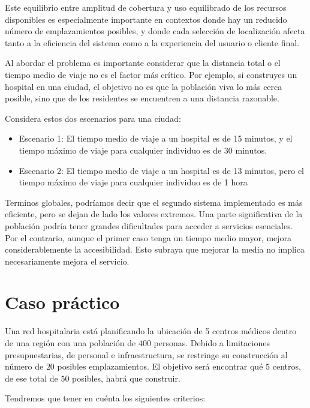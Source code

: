 \documentclass[12pt,a4paper]{book}
\begin{document}
Este equilibrio entre amplitud de cobertura y uso equilibrado de los recursos disponibles es especialmente importante en contextos donde hay un reducido número de emplazamientos posibles, y donde cada selección de localización afecta tanto a la eficiencia del sistema como a la experiencia del usuario o cliente final.

Al abordar el problema es importante considerar que la distancia total o el tiempo medio de viaje no es el factor más crítico. Por ejemplo, si construyes un hospital en una ciudad, el objetivo no es que la población viva lo más cerca posible, sino que de
los residentes se encuentren a una distancia razonable. 

Considera estos dos escenarios para una ciudad:
\begin{itemize}
    \item Escenario 1: El tiempo medio de viaje a un hospital es de 15 minutos, y el tiempo máximo de viaje para cualquier individuo es de 30 minutos.
    \item Escenario 2: El tiempo medio de viaje a un hospital es de 13 minutos, pero el tiempo máximo de viaje para cualquier individuo es de 1 hora
\end{itemize} 
Terminos globales, podríamos decir que el segundo sistema implementado es más eficiente, pero se dejan de lado los valores extremos. Una parte significativa de la población podría tener grandes dificultades para acceder a servicios esenciales. Por el contrario, aunque el primer caso tenga un tiempo medio mayor, mejora considerablemente la accesibilidad. Esto subraya que mejorar la media no implica necesariamente mejora el servicio.

\section{Caso práctico}

Una red hospitalaria está planificando la ubicación de 5 centros médicos dentro de una región con una población de $400$ personas. Debido a limitaciones presupuestarias, de personal e infraestructura, se restringe su construcción al número de $20$ posibles emplazamientos. El objetivo será encontrar qué $5$ centros, de ese total de $50$ posibles, habrá que construir.

Tendremos que tener en cuénta los siguientes criterios:
\end{document}
